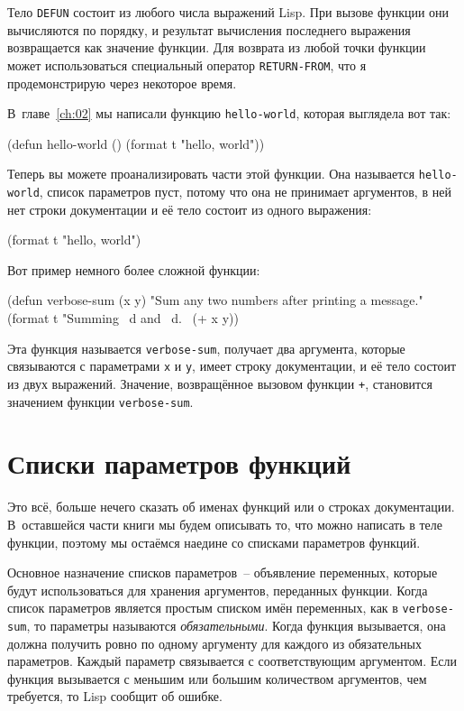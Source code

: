 Тело \lstinline{DEFUN} состоит из любого числа выражений Lisp.  При вызове функции они
вычисляются по порядку, и результат вычисления последнего выражения возвращается как
значение функции.  Для возврата из любой точки функции может использоваться специальный
оператор \lstinline{RETURN-FROM}, что я продемонстрирую через некоторое время.

В~главе~\ref{ch:02} мы написали функцию \lstinline{hello-world}, которая выглядела вот так:

\begin{myverb}
(defun hello-world () (format t "hello, world"))
\end{myverb}

Теперь вы можете проанализировать части этой функции.  Она называется \lstinline{hello-world},
список параметров пуст, потому что она не принимает аргументов, в ней нет строки
документации и её тело состоит из одного выражения:

\begin{myverb}
(format t "hello, world")
\end{myverb}

Вот пример немного более сложной функции:

\begin{myverb}
(defun verbose-sum (x y)
  "Sum any two numbers after printing a message."
  (format t "Summing ~d and ~d.~%
  (+ x y))
\end{myverb}

Эта функция называется \lstinline{verbose-sum}, получает два аргумента, которые связываются с
параметрами \lstinline{x} и \lstinline{y}, имеет строку документации, и её тело состоит из двух
выражений.  Значение, возвращённое вызовом функции \lstinline{+}, становится значением функции
\lstinline{verbose-sum}.

\section{Списки параметров функций}

Это всё, больше нечего сказать об именах функций или о строках документации. В~оставшейся
части книги мы будем описывать то, что можно написать в теле функции, поэтому мы остаёмся
наедине со списками параметров функций.

Основное назначение списков параметров~-- объявление переменных, которые будут
использоваться для хранения аргументов, переданных функции.  Когда список параметров
является простым списком имён переменных, как в \lstinline{verbose-sum}, то параметры
называются \textit{обязательными}.  Когда функция вызывается, она должна получить ровно по
одному аргументу для каждого из обязательных параметров.  Каждый параметр связывается с
соответствующим аргументом.  Если функция вызывается с меньшим или большим количеством
аргументов, чем требуется, то Lisp сообщит об ошибке.

